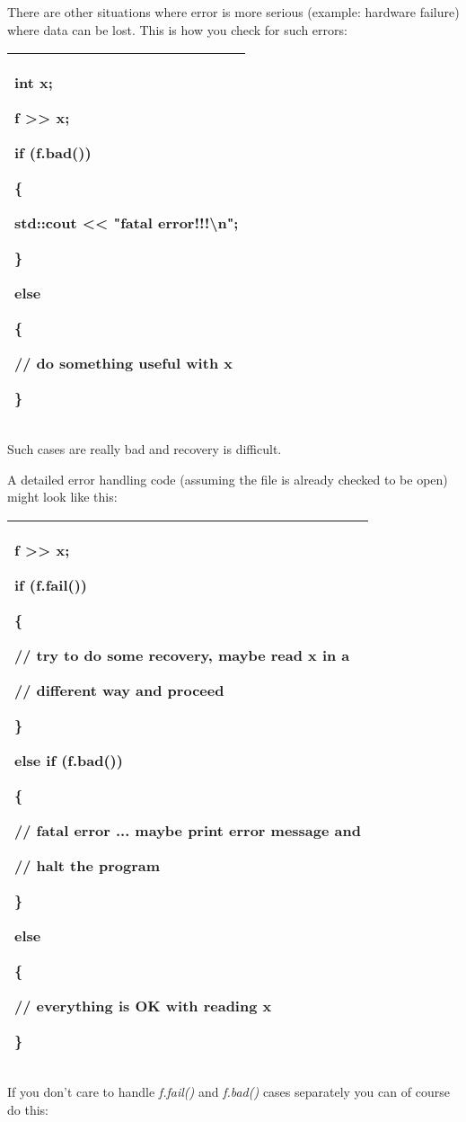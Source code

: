 \documentclass[
]{article}
\begin{document}
There are other situations where error is more serious (example:
hardware failure) where data can be lost. This is how you check for such
errors:

\begin{longtable}[]{@{}l@{}}
\toprule
\endhead
\begin{minipage}[t]{0.97\columnwidth}\raggedright
int x;

f \textgreater\textgreater{} x;

if (f.bad())

\{

std::cout \textless\textless{} "fatal error!!!\textbackslash n";

\}

else

\{

// do something useful with x

\}\strut
\end{minipage}\tabularnewline
\bottomrule
\end{longtable}

Such cases are really bad and recovery is difficult.

A detailed error handling code (assuming the file is already checked to
be open) might look like this:

\begin{longtable}[]{@{}l@{}}
\toprule
\endhead
\begin{minipage}[t]{0.97\columnwidth}\raggedright
f \textgreater\textgreater{} x;

if (f.fail())

\{

// try to do some recovery, maybe read x in a

// different way and proceed

\}

else if (f.bad())

\{

// fatal error ... maybe print error message and

// halt the program

\}

else

\{

// everything is OK with reading x

\}\strut
\end{minipage}\tabularnewline
\bottomrule
\end{longtable}

If you don't care to handle \emph{f.fail()} and \emph{f.bad()} cases
separately you can of course do this:
\end{document}

